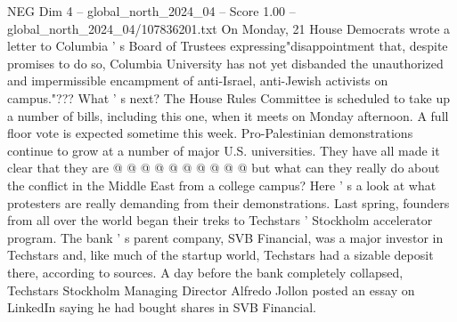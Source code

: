 \begin{textsample}{NEG Dim 4 – global\_north\_2024\_04 – Score 1.00 – global\_north\_2024\_04/107836201.txt}
On Monday, 21 House Democrats wrote a letter to Columbia ' s Board of Trustees expressing"disappointment that, despite promises to do so, Columbia University has not yet disbanded the unauthorized and impermissible encampment of anti-Israel, anti-Jewish activists on campus."???
What ' s next?
The House Rules Committee is scheduled to take up a number of bills, including this one, when it meets on Monday afternoon.
A full floor vote is expected sometime this week.
Pro-Palestinian demonstrations continue to grow at a number of major U.S. universities.
They have all made it clear that they are @ @ @ @ @ @ @ @ @ @ but what can they really do about the conflict in the Middle East from a college campus?
Here ' s a look at what protesters are really demanding from their demonstrations.
Last spring, founders from all over the world began their treks to Techstars ' Stockholm accelerator program.
The bank ' s parent company, SVB Financial, was a major investor in Techstars and, like much of the startup world, Techstars had a sizable deposit there, according to sources.
A day before the bank completely collapsed, Techstars Stockholm Managing Director Alfredo Jollon posted an essay on LinkedIn saying he had bought shares in SVB Financial.

\end{textsample}
